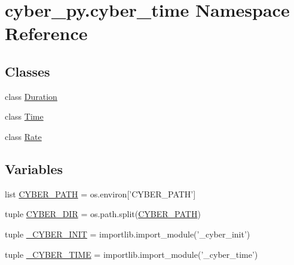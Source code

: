 \hypertarget{namespacecyber__py_1_1cyber__time}{\section{cyber\-\_\-py.\-cyber\-\_\-time Namespace Reference}
\label{namespacecyber__py_1_1cyber__time}
}
\subsection*{Classes}
\begin{DoxyCompactItemize}
\item 
class \hyperlink{classcyber__py_1_1cyber__time_1_1Duration}{Duration}
\item 
class \hyperlink{classcyber__py_1_1cyber__time_1_1Time}{Time}
\item 
class \hyperlink{classcyber__py_1_1cyber__time_1_1Rate}{Rate}
\end{DoxyCompactItemize}
\subsection*{Variables}
\begin{DoxyCompactItemize}
\item 
list \hyperlink{namespacecyber__py_1_1cyber__time_a3430eb07f0b870629f75467c4d6096ac}{C\-Y\-B\-E\-R\-\_\-\-P\-A\-T\-H} = os.\-environ\mbox{[}'C\-Y\-B\-E\-R\-\_\-\-P\-A\-T\-H'\mbox{]}
\item 
tuple \hyperlink{namespacecyber__py_1_1cyber__time_abd73c61394f5397dc5a834393b9ee2ba}{C\-Y\-B\-E\-R\-\_\-\-D\-I\-R} = os.\-path.\-split(\hyperlink{namespacecyber__py_1_1cyber__time_a3430eb07f0b870629f75467c4d6096ac}{C\-Y\-B\-E\-R\-\_\-\-P\-A\-T\-H})
\item 
tuple \hyperlink{namespacecyber__py_1_1cyber__time_a7ea33ec20ee4662014698fd3345ae83b}{\-\_\-\-C\-Y\-B\-E\-R\-\_\-\-I\-N\-I\-T} = importlib.\-import\-\_\-module('\-\_\-cyber\-\_\-init')
\item 
tuple \hyperlink{namespacecyber__py_1_1cyber__time_ad395f8a1e071492a14b1ab84f1eaac58}{\-\_\-\-C\-Y\-B\-E\-R\-\_\-\-T\-I\-M\-E} = importlib.\-import\-\_\-module('\-\_\-cyber\-\_\-time')
\end{DoxyCompactItemize}


